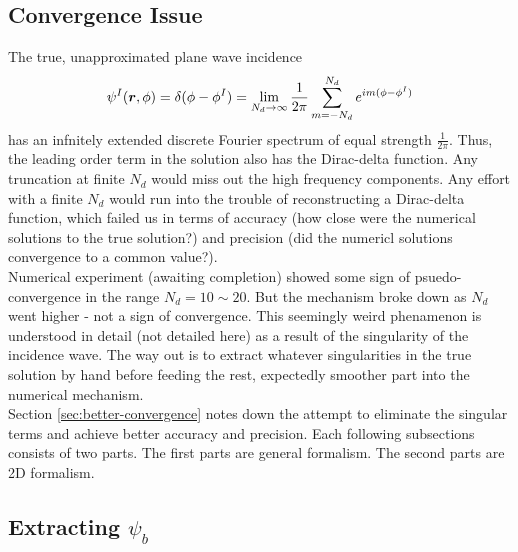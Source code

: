 \documentclass [10pt,letterpaper]{article}
\begin{document}
\subsection{Convergence Issue}
\label{sub:convergence-issue}
The true, unapproximated plane wave incidence
\begin{equation} \label{eq:harmonic-expansion-of-psiI-2d}
	\psi^I(\vectorsym{r},\phi)
	=
	\delta(\phi-\phi^I)
	=
	\lim_{N_d \to \infty}
	\frac{1}{2\pi} 
	\sum\limits_{m=-N_d}^{N_d}
	e^{i m (\phi-\phi^I)}
\end{equation}
has an infnitely extended discrete Fourier spectrum of equal strength $\frac{1}{2\pi}$.
Thus, the leading order term in the solution also has the Dirac-delta function.
Any truncation at finite $N_d$ would miss out the high frequency components.
Any effort with a finite $N_d$ would run into the trouble of reconstructing a Dirac-delta function, 
which failed us in terms of accuracy (how close were the numerical solutions to the true solution?) and precision (did the numericl solutions convergence to a common value?).
\\
Numerical experiment (awaiting completion) showed some sign of psuedo-convergence in the range $N_d=10\sim20$. 
But the mechanism broke down as $N_d$ went higher - not a sign of convergence.
This seemingly weird phenamenon is understood in detail (not detailed here) as a result of the singularity of the incidence wave.
The way out is to extract whatever singularities in the true solution by hand before feeding the rest, expectedly smoother part into the numerical mechanism.
\\
Section \eqref{sec:better-convergence} notes down the attempt to eliminate the singular terms and achieve better accuracy and precision.
Each following subsections consists of two parts.
The first parts are general formalism.
The second parts are 2D formalism.


\subsection{Extracting $\psi_b$}
\label{sub:extracting-psib}
\end{document}
